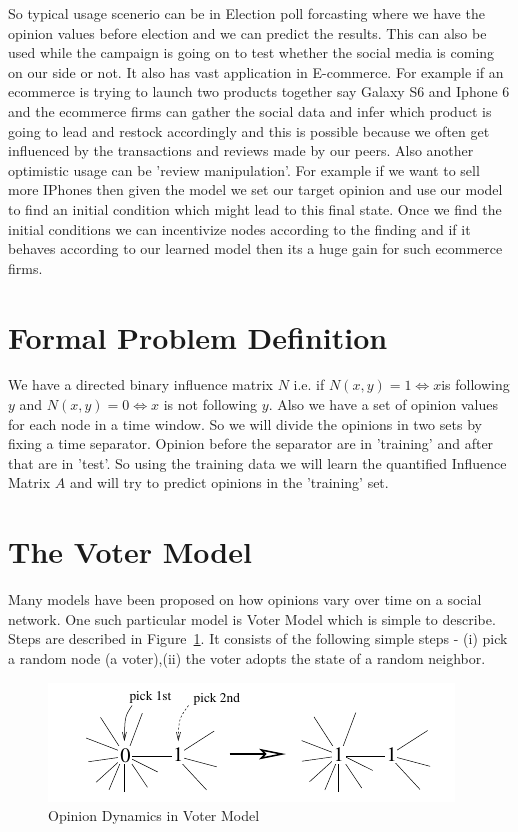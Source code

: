 So typical usage scenerio can be in Election poll forcasting where we have the opinion values before election and we can predict the results. This can also be used while the campaign is going on to test whether the social media is coming on our side or not. It also has vast application in E-commerce. For example if an ecommerce is trying to launch two products together say Galaxy S6 and Iphone 6 and the ecommerce firms can gather the social data and infer which product is going to lead and restock accordingly and this is possible because we often get influenced by the transactions and reviews made by our peers. Also another optimistic usage can be 'review manipulation'. For example if we want to sell more IPhones then given the model we set our target opinion and use our model to find an initial condition which might lead to this final state. Once we find the initial conditions we can incentivize nodes according to the finding and if it behaves according to our learned model then its a huge gain for such ecommerce firms.
\section*{Formal Problem Definition}
We have a directed binary influence matrix $N$ i.e. if $N(x,y) = 1 \Longleftrightarrow x $is following $y$ and $N(x,y) = 0 \Longleftrightarrow x$ is not following $y$. Also we have a set of opinion values for each node in a time window. So we will divide the opinions in two sets by fixing a time separator. Opinion before the separator are in 'training' and after that are in 'test'. So using the training data we will learn the quantified Influence Matrix $A$ and will try to predict opinions in the 'training' set.
\section*{The Voter Model}
Many models have been proposed on how opinions vary over time on a social network. One such particular model is Voter Model which is simple to describe. Steps are described in Figure~\ref{fig:voter_model}. It consists of the following simple steps - (i) pick a random node (a voter),(ii) the voter adopts the state of a random neighbor.

\begin{figure}
\centering
\includegraphics[width=\textwidth,height=\textheight,keepaspectratio]{opinion_dynamics/images/voter_model.png}
\caption{Opinion Dynamics in Voter Model}
\label{fig:voter_model}
\end{figure}

